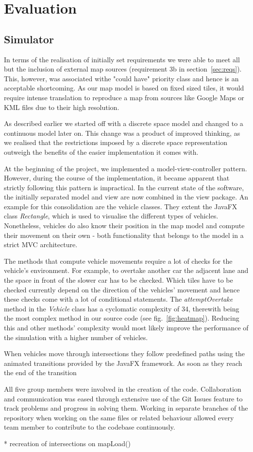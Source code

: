 \section{Evaluation}
\subsection{Simulator}\label{ss:eval_sim}
In terms of the realisation of initially set requirements we were able to meet all but the inclusion of external map sources (requirement 3b in section~\ref{sec:reqs}). This, however, was associated withe "could have" priority class and hence is an acceptable shortcoming. As our map model is based on fixed sized tiles, it would require intense translation to reproduce a map from sources like Google Maps or KML files due to their high resolution. 

As described earlier we started off with a discrete space model and changed to a continuous model later on. This change was a product of improved thinking, as we realised that the restrictions imposed by a discrete space representation outweigh the benefits of the easier implementation it comes with.

At the beginning of the project, we implemented a model-view-controller pattern. However, during the course of the implementation, it became apparent that strictly following this pattern is impractical. In the current state of the software, the initially separated model and view are now combined in the view package. An example for this consolidation are the vehicle classes. They extent the JavaFX class \textit{Rectangle}, which is used to visualise the different types of vehicles. Nonetheless, vehicles do also know their position in the map model and compute their movement on their own - both functionality that belongs to the model in a strict MVC architecture.

The methods that compute vehicle movements require a lot of checks for the vehicle's environment. For example, to overtake another car the adjacent lane and the space in front of the slower car has to be checked. Which tiles have to be checked currently depend on the direction of the vehicles' movement and hence these checks come with a lot of conditional statements. The \textit{attemptOvertake} method in the \textit{Vehicle} class has a cyclomatic complexity of 34, therewith being the most complex method in our source code (see fig.~\ref{fig:heatmap}). Reducing this and other methods' complexity would most likely improve the performance of the simulation with a higher number of vehicles. 

When vehicles move through intersections they follow predefined paths using the animated transitions provided by the JavaFX framework. As soon as they reach the end of the transition 

All five group members were involved in the creation of the code. Collaboration and communication was eased through extensive use of the Git Issues feature to track problems and progress in solving them. Working in separate branches of the repository when working on the same files or related behaviour allowed every team member to contribute to the codebase continuously.  

\bigskip
* recreation of intersections on mapLoad()
